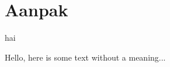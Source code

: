 \documentclass[../DCM2_Verslag.tex]{subfiles}
\begin{document}
\section{Aanpak}

hai

Hello, here is some text without a meaning...
\end{document}
